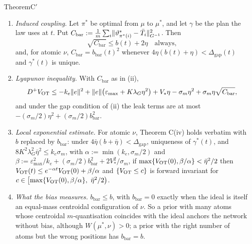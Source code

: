 \begin{thm}{Theorem}{C$'$}
\begin{enumerate}[label=\textup{(\roman*)}]
    Theorem C(i).
  \item \emph{Induced coupling.} Let $\pi^*$ be optimal from $\mu$ to $\mu^*$, and let $\gamma$ be the plan the law
    uses at $t$. Put $C_{\mathrm{bar}} := \frac1m\sum_i\lVert \vartheta^*_{\pi^*(i)} - \bar T_i\rVert^2_{G^{-1}}$. Then
    \[
      \sqrt{C_{\mathrm{bar}}} \le b(t) + 2\eta \quad\text{always},
    \]
    and, for atomic $\nu$, $C_{\mathrm{bar}} = b_{\mathrm{bar}}(t)^2$ whenever
    $4\eta(b(t)+\eta) < \Delta_{\mathrm{gap}}(t)$ and $\gamma^*(t)$ is unique.
  \item \emph{Lyapunov inequality.} With $C_{\mathrm{bar}}$ as in \textup{(ii)},
    \[
      D^+V_{\mathrm{OT}} \le -k_e\lVert e\rVert^2 + \lVert e\rVert\bigl(\varepsilon_{\max} + K\lambda_G\eta^2\bigr) + V_*\eta
      - \sigma_m\eta^2 + \sigma_m\eta\sqrt{C_{\mathrm{bar}}},
    \]
    and under the gap condition of \textup{(ii)} the leak terms are at most
    $-(\sigma_m/2)\eta^2 + (\sigma_m/2)b_{\mathrm{bar}}^2$.
  \item \emph{Local exponential estimate.} For atomic $\nu$, Theorem C(iv) holds verbatim with $b$ replaced by
    $b_{\mathrm{bar}}$: under $4\bar\eta(b+\bar\eta) < \Delta_{\mathrm{gap}}$, uniqueness of $\gamma^*(t)$, and
    $8K^2\lambda_G^2\bar\eta^2 \le k_e\sigma_m$, with $\alpha := \min(k_e,\sigma_m/2)$ and
    $\beta := \varepsilon_{\max}^2/k_e + (\sigma_m/2)b_{\mathrm{bar}}^2 + 2V_*^2/\sigma_m$, if
    $\max\{V_{\mathrm{OT}}(0),\beta/\alpha\} < \bar\eta^2/2$ then $V_{\mathrm{OT}}(t) \le e^{-\alpha t}V_{\mathrm{OT}}(0) + \beta/\alpha$ and
    $\{V_{\mathrm{OT}}\le c\}$ is forward invariant for $c\in\bigl[\max\{\VOT(0),\beta/\alpha\},\ \bar\eta^2/2\bigr)$.
  \item \emph{What the bias measures.} $b_{\mathrm{bar}} \le b$, with $b_{\mathrm{bar}} = 0$ exactly when the ideal is
    itself an equal-mass centroidal configuration of $\nu$. So a prior with many atoms whose centroidal
    $m$-quantisation coincides with the ideal anchors the network without bias, although $W(\mu^*,\nu) > 0$; a prior
    with the right number of atoms but the wrong positions has $b_{\mathrm{bar}} = b$.
\end{enumerate}
\end{thm}


